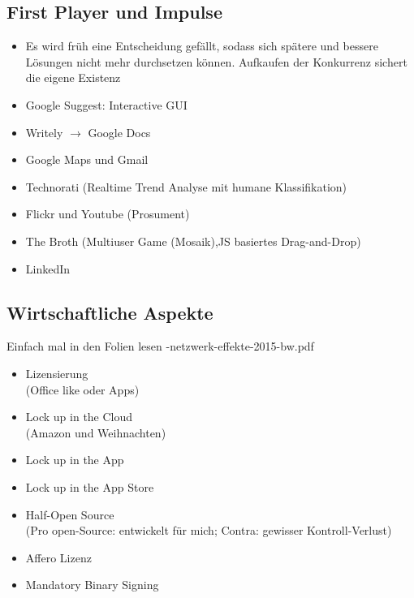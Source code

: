 \documentclass{article} %
\begin{document}
	\subsection{First Player und Impulse}
	\begin{itemize}
		\item Es wird früh eine Entscheidung gefällt, sodass sich spätere und bessere Lösungen nicht mehr durchsetzen können. Aufkaufen der Konkurrenz sichert die eigene Existenz
		\item Google Suggest: Interactive GUI
		\item Writely $\rightarrow$ Google Docs
		\item Google Maps und Gmail
		\item Technorati (Realtime Trend Analyse mit humane Klassifikation)
		\item Flickr und Youtube (Prosument)
		\item The Broth (Multiuser Game (Mosaik),JS basiertes Drag-and-Drop)  
		\item LinkedIn
	\end{itemize}
	\subsection{Wirtschaftliche Aspekte}
	Einfach mal in den Folien lesen -netzwerk-effekte-2015-bw.pdf\grqq
		\begin{itemize}
			\item Lizensierung\\
			(Office like oder Apps)
			\item Lock up in the Cloud\\
			(Amazon und Weihnachten)
			\item Lock up in the App
			\item Lock up in the App Store
			\item Half-Open Source\\
			(Pro open-Source: entwickelt für mich; Contra: gewisser Kontroll-Verlust)
			\item Affero Lizenz
			\item Mandatory Binary Signing
		\end{itemize}
\end{document}
